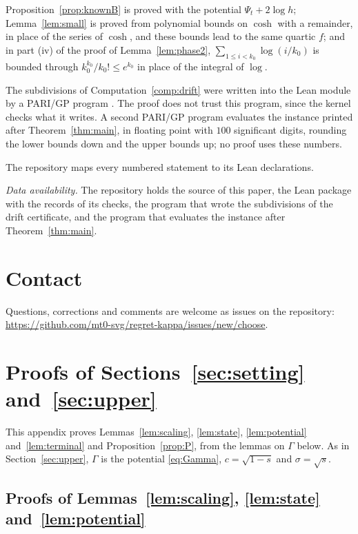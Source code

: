 \documentclass[12pt]{amsart}
\newcommand{\repo}{https://github.com/mt0-svg/regret-kappa}
\theoremstyle{definition}
\numberwithin{equation}{section}
\begin{document}
Proposition~\ref{prop:knownB} is proved with the potential $\Psi_t+2\log h$; Lemma~\ref{lem:small} is proved from polynomial bounds on $\cosh$ with a remainder, in place of the series of $\cosh$, and these bounds lead to the same quartic $f$; and in part (iv) of the proof of Lemma~\ref{lem:phase2}, $\sum_{1\le i<k_0}\log(i/k_0)$ is bounded through $k_0^{k_0}/k_0!\le e^{k_0}$ in place of the integral of $\log$.

The subdivisions of Computation~\ref{comp:drift} were written into the Lean module by a PARI/GP program \citep{PARI}. The proof does not trust this program, since the kernel checks what it writes. A second PARI/GP program evaluates the instance printed after Theorem~\ref{thm:main}, in floating point with $100$ significant digits, rounding the lower bounds down and the upper bounds up; no proof uses these numbers.

The repository \citep{repo} maps every numbered statement to its Lean declarations.

\emph{Data availability.} The repository \citep{repo} holds the source of this paper, the Lean package with the records of its checks, the program that wrote the subdivisions of the drift certificate, and the program that evaluates the instance after Theorem~\ref{thm:main}.

\section*{Contact}
Questions, corrections and comments are welcome as issues on the repository: \url{\repo/issues/new/choose}.

\appendix

\section{Proofs of Sections~\ref{sec:setting} and~\ref{sec:upper}}\label{app:upper}

This appendix proves Lemmas~\ref{lem:scaling}, \ref{lem:state}, \ref{lem:potential} and~\ref{lem:terminal} and Proposition~\ref{prop:P}, from the lemmas on $\Gamma$ below. As in Section~\ref{sec:upper}, $\Gamma$ is the potential \eqref{eq:Gamma}, $c=\sqrt{1-s}$ and $\sigma=\sqrt s$.

\subsection{Proofs of Lemmas~\ref{lem:scaling}, \ref{lem:state} and~\ref{lem:potential}}
\end{document}
